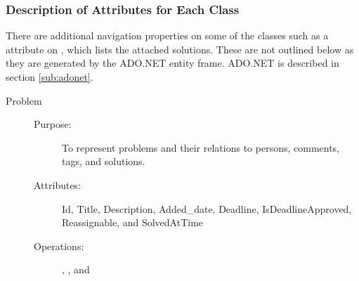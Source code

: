 \subsubsection{Description of Attributes for Each Class}
There are additional navigation properties on some of the classes such as a  attribute on , which lists the attached solutions. These are not outlined below as they are generated by the ADO.NET entity frame. ADO.NET is described in section \ref{sub:adonet}.
\begin{description}
\item[Problem]\hfill
\begin{description}
	\item[Purpose:]To represent problems and their relations to persons, comments, tags, and solutions.
	\item[Attributes:]Id, Title, Description, Added\_date, Deadline, IsDeadlineApproved, Reassignable, and SolvedAtTime
	\item[Operations:], , and 
\end{description}
\end{description}

